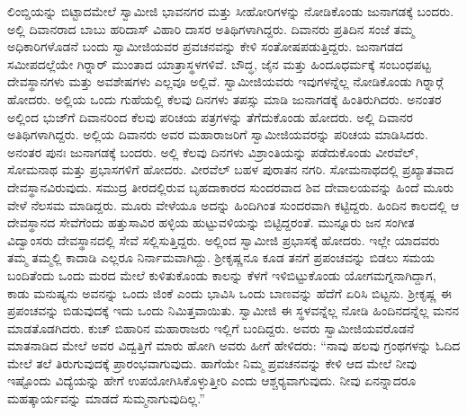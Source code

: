  ಲಿಂಬ್ಡಿಯನ್ನು ಬಿಟ್ಟಾದಮೇಲೆ ಸ್ವಾಮೀಜಿ ಭಾವನಗರ ಮತ್ತು ಸೀಹೋರಿಗಳನ್ನು ನೋಡಿಕೊಂಡು ಜುನಾಗಡಕ್ಕೆ ಬಂದರು. ಅಲ್ಲಿ ದಿವಾನರಾದ ಬಾಬು ಹರಿದಾಸ್ ವಿಹಾರಿ ದಾಸರ ಅತಿಥಿಗಳಾಗಿದ್ದರು. ದಿವಾನರು ಪ್ರತಿದಿನ ಸಂಜೆ ತಮ್ಮ ಅಧಿಕಾರಿಗಳೊಡನೆ ಬಂದು ಸ್ವಾಮೀಜಿಯವರ ಪ್ರವಚನವನ್ನು ಕೇಳಿ ಸಂತೋಷಪಡುತ್ತಿದ್ದರು. ಜುನಾಗಡದ ಸಮೀಪದಲ್ಲೆಯೇ ಗಿರ‍್ನಾರ್ ಮುಂತಾದ ಯಾತ್ರಾಸ್ಥಳಗಳಿವೆ. ಬೌದ್ಧ, ಜೈನ ಮತ್ತು ಹಿಂದೂಧರ್ಮಕ್ಕೆ ಸಂಬಂಧಪಟ್ಟ ದೇವಸ್ಥಾನಗಳು ಮತ್ತು ಅವಶೇಷಗಳು ಎಲ್ಲವೂ ಅಲ್ಲಿವೆ. ಸ್ವಾಮೀಜಿಯವರು ಇವುಗಳನ್ನೆಲ್ಲ ನೋಡಿಕೊಂಡು ಗಿರ‍್ನಾರ್‍ಗೆ ಹೋದರು. ಅಲ್ಲಿಯ ಒಂದು ಗುಹೆಯಲ್ಲಿ ಕೆಲವು ದಿನಗಳು ತಪಸ್ಸು ಮಾಡಿ ಜುನಾಗಡಕ್ಕೆ ಹಿಂತಿರುಗಿದರು. ಅನಂತರ ಅಲ್ಲಿಂದ ಭುಜ್‍ಗೆ ದಿವಾನರಿಂದ ಕೆಲವು ಪರಿಚಯ ಪತ್ರಗಳನ್ನು ತೆಗೆದುಕೊಂಡು ಹೋದರು. ಅಲ್ಲಿ ದಿವಾನರ ಅತಿಥಿಗಳಾಗಿದ್ದರು. ಅಲ್ಲಿಯ ದಿವಾನರು ಅವರ ಮಹಾರಾಜರಿಗೆ ಸ್ವಾಮೀಜಿಯವರನ್ನು ಪರಿಚಯ ಮಾಡಿಸಿದರು. ಅನಂತರ ಪುನಃ ಜುನಾಗಡಕ್ಕೆ ಬಂದರು. ಅಲ್ಲಿ ಕೆಲವು ದಿನಗಳು ವಿಶ್ರಾಂತಿಯನ್ನು ಪಡೆದುಕೊಂಡು ವೀರವೆಲ್, ಸೋಮನಾಥ ಮತ್ತು ಪ್ರಭಾಸಗಳಿಗೆ ಹೋದರು. ವೀರವೆಲ್ ಬಹಳ ಪುರಾತನ ನಗರಿ. ಸೋಮನಾಥದಲ್ಲಿ ಪ್ರಖ್ಯಾತವಾದ ದೇವಸ್ಥಾನವಿರುವುದು. ಸಮುದ್ರ ತೀರದಲ್ಲಿರುವ ಬೃಹದಾಕಾರದ ಸುಂದರವಾದ ಶಿವ ದೇವಾಲಯವನ್ನು ಹಿಂದೆ ಮೂರು ವೇಳೆ ನೆಲಸಮ ಮಾಡಿದ್ದರು. ಮೂರು ವೇಳೆಯೂ ಅದನ್ನು ಹಿಂದಿಗಿಂತ ಸುಂದರವಾಗಿ ಕಟ್ಟಿದ್ದರು. ಹಿಂದಿನ ಕಾಲದಲ್ಲಿ ಆ ದೇವಸ್ಥಾನದ ಸೇವೆಗೆಂದು ಹತ್ತುಸಾವಿರ ಹಳ್ಳಿಯ ಹುಟ್ಟುವಳಿಯನ್ನು ಬಿಟ್ಟಿದ್ದರಂತೆ. ಮುನ್ನೂರು ಜನ ಸಂಗೀತ ವಿದ್ವಾಂಸರು ದೇವಸ್ಥಾನದಲ್ಲಿ ಸೇವೆ ಸಲ್ಲಿಸುತ್ತಿದ್ದರು. ಅಲ್ಲಿಂದ ಸ್ವಾಮೀಜಿ ಪ್ರಭಾಸಕ್ಕೆ ಹೋದರು. ಇಲ್ಲೇ ಯಾದವರು ತಮ್ಮ ತಮ್ಮಲ್ಲಿ ಕಾದಾಡಿ ಎಲ್ಲರೂ ನಿರ್ನಾಮವಾಗಿದ್ದು. ಶ‍್ರೀಕೃಷ್ಣನೂ ಕೂಡ ತನಗೆ ಪ್ರಪಂಚವನ್ನು ಬಿಡಲು ಸಮಯ ಬಂದಿತೆಂದು ಒಂದು ಮರದ ಮೇಲೆ ಕುಳಿತುಕೊಂಡು ಕಾಲನ್ನು ಕೆಳಗೆ ಇಳಿಬಿಟ್ಟುಕೊಂಡು ಯೋಗಮಗ್ನನಾಗಿದ್ದಾಗ, ಕಾಡು ಮನುಷ್ಯನು ಅವನನ್ನು ಒಂದು ಜಿಂಕೆ ಎಂದು ಭಾವಿಸಿ ಒಂದು ಬಾಣವನ್ನು ಹೆದೆಗೆ ಏರಿಸಿ ಬಿಟ್ಟನು. ಶ‍್ರೀಕೃಷ್ಣ ಈ ಪ್ರಪಂಚವನ್ನು ಬಿಡುವುದಕ್ಕೆ ಇದು ಒಂದು ನಿಮಿತ್ತವಾಯಿತು. ಸ್ವಾಮೀಜಿ ಈ ಸ್ಥಳವನ್ನೆಲ್ಲ ನೋಡಿ ಹಿಂದಿನದನ್ನೆಲ್ಲ ಮನನ ಮಾಡತೊಡಗಿದರು. ಕುಚ್ ಬಿಹಾರಿನ ಮಹಾರಾಜರು ಇಲ್ಲಿಗೆ ಬಂದಿದ್ದರು. ಅವರು ಸ್ವಾಮೀಜಿಯವರೊಡನೆ ಮಾತನಾಡಿದ ಮೇಲೆ ಅವರ ವಿದ್ವತ್ತಿಗೆ ಮಾರು ಹೋಗಿ ಅವರು ಹೀಗೆ ಹೇಳಿದರು: “ನಾವು ಹಲವು ಗ್ರಂಥಗಳನ್ನು ಓದಿದ ಮೇಲೆ ತಲೆ ತಿರುಗುವುದಕ್ಕೆ ಪ್ರಾರಂಭವಾಗುವುದು. ಹಾಗೆಯೇ ನಿಮ್ಮ ಪ್ರವಚನವನ್ನು ಕೇಳಿ ಆದ ಮೇಲೆ ನೀವು ಇಷ್ಟೊಂದು ವಿದ್ಯೆಯನ್ನು ಹೇಗೆ ಉಪಯೋಗಿಸಿಕೊಳ್ಳುತ್ತೀರಿ ಎಂದು ಆಶ್ಚರ‍್ಯವಾಗುವುದು. ನೀವು ಏನನ್ನಾದರೂ ಮಹತ್ಕಾರ್ಯವನ್ನು ಮಾಡದೆ ಸುಮ್ಮನಾಗುವುದಿಲ್ಲ.”

